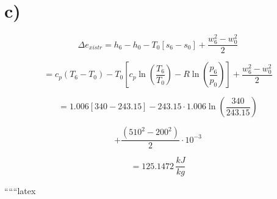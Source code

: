 

\section*{c)}

\[
\Delta e_{xistr} = h_6 - h_0 - T_0 \left[ s_6 - s_0 \right] + \frac{w_6^2 - w_0^2}{2}
\]

\[
= c_p (T_6 - T_0) - T_0 \left[ c_p \ln \left( \frac{T_6}{T_0} \right) - R \ln \left( \frac{p_6}{p_0} \right) \right] + \frac{w_6^2 - w_0^2}{2}
\]

\[
= 1.006 \left[ 340 - 243.15 \right] - 243.15 \cdot 1.006 \ln \left( \frac{340}{243.15} \right)
\]

\[
+ \frac{(510^2 - 200^2)}{2} \cdot 10^{-3}
\]

\[
= 125.1472 \, \frac{kJ}{kg}
\]

``````latex